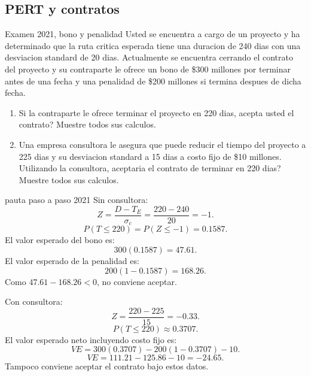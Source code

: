 \subsection{PERT y contratos}

\begin{enunciado}{Examen 2021, bono y penalidad}
Usted se encuentra a cargo de un proyecto y ha determinado que la ruta critica esperada tiene una duracion de 240 dias con una desviacion standard de 20 dias. Actualmente se encuentra cerrando el contrato del proyecto y su contraparte le ofrece un bono de \$300 millones por terminar antes de una fecha y una penalidad de \$200 millones si termina despues de dicha fecha.

\begin{enumerate}[label=\alph*)]
  \item Si la contraparte le ofrece terminar el proyecto en 220 dias, acepta usted el contrato? Muestre todos sus calculos.
  \item Una empresa consultora le asegura que puede reducir el tiempo del proyecto a 225 dias y su desviacion standard a 15 dias a costo fijo de \$10 millones. Utilizando la consultora, aceptaria el contrato de terminar en 220 dias? Muestre todos sus calculos.
\end{enumerate}
\end{enunciado}

\begin{pautacompleta}{pauta paso a paso 2021}
Sin consultora:
\[
  Z=\frac{D-T_E}{\sigma_c}=\frac{220-240}{20}=-1.
\]
\[
  P(T\leq 220)=P(Z\leq -1)=0.1587.
\]
El valor esperado del bono es:
\[
  300(0.1587)=47.61.
\]
El valor esperado de la penalidad es:
\[
  200(1-0.1587)=168.26.
\]
Como $47.61-168.26<0$, no conviene aceptar.

Con consultora:
\[
  Z=\frac{220-225}{15}=-0.33.
\]
\[
  P(T\leq 220)\approx 0.3707.
\]
El valor esperado neto incluyendo costo fijo es:
\[
  VE=300(0.3707)-200(1-0.3707)-10.
\]
\[
  VE=111.21-125.86-10=-24.65.
\]
Tampoco conviene aceptar el contrato bajo estos datos.
\end{pautacompleta}

